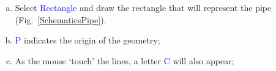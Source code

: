 \documentclass[10pt,compress, unknownkeysallowed]{beamer}
\newcommand{\blue}{\textcolor{blue}}
\begin{document}
\begin{frame}
\begin{columns}
\begin{column}[l]{0.5\linewidth}
\begin{enumerate}[1)]
\begin{enumerate}[a)]
                    \item<3-> Select \blue{Rectangle} and draw the rectangle that will represent the pipe (Fig.~\ref{SchematicsPipe}). 
                    \item<3-> \blue{P} indicates the origin of the geometry;
                    \item<3-> As the mouse `touch' the lines, a letter \blue{C} will also appear;
                 \end{enumerate}
          \end{enumerate} 
          \begin{center}
          \end{center}
       \end{column}
    \end{columns}

\end{frame} 
\end{document}
